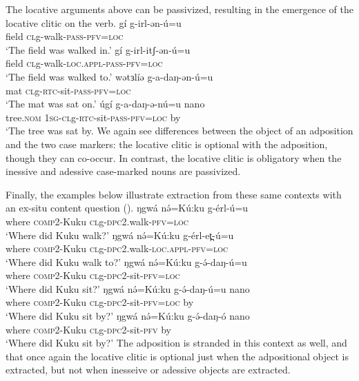 The locative arguments above can be passivized, resulting in the emergence of the locative clitic on the verb. 
\ea 	\gll gí g-irl-ən-ú=u \\
		  field \textsc{cl}g-walk-\textsc{pass}-\textsc{pfv}=\textsc{loc}\\
		\glt `The field was walked in.'
\ex 	\gll gí g-irl-itʃ-ən-ú=u \\
		     field \textsc{cl}g-walk-\textsc{loc.appl}-\textsc{pass}-\textsc{pfv}=\textsc{loc} \\
		\glt `The field was walked to.'
\ex 	\gll 	 wətɜlíə  g-a-daŋ-ən-ú=u \\
			mat		\textsc{cl}g-\textsc{rtc}-sit-\textsc{pass-pfv}=\textsc{loc}\\
		\glt `The mat was sat on.'
\ex	
\gll úgí g-a-daŋ-ə-nú=u nano		\\	
			tree.\textsc{nom} \textsc{1sg}-\textsc{cl}g-\textsc{rtc}-sit-\textsc{pass-pfv=loc} by \\
		\glt `The tree was sat by.
\z 
We again see differences between the object of an adposition and the two case markers: the locative clitic is optional with the adposition, though they can co-occur. In contrast, the locative clitic is obligatory when the inessive and adessive case-marked nouns are passivized.

Finally, the examples below illustrate extraction from these same contexts with an ex-situ content question ().
\ea
		\gll ŋgwá nə́=Kú:ku g-érl-ú=u \\
		     where \textsc{comp2}-Kuku \textsc{cl}g-\textsc{dpc2}.walk-\textsc{pfv}=\textsc{loc} \\
		\glt `Where did Kuku walk?'
\ex 	\gll ŋgwá nə́=Kú:ku g-érl-et̪-ú=u \\
		     where \textsc{comp2}-Kuku \textsc{cl}g-\textsc{dpc2}.walk-\textsc{loc.appl-pfv}=\textsc{loc} \\
		\glt `Where did Kuku walk to?'
\ex 	\gll 	 ŋgwá nə́=Kú:ku g-ə́-daŋ-ú=u \\
			where  \textsc{comp2}-Kuku  \textsc{cl}g-\textsc{dpc2}-sit-\textsc{pfv}=\textsc{loc}\\
		\glt `Where did Kuku sit?'
\ex	
	\ea \gll ŋgwá  nə́=Kú:ku g-ə́-daŋ-ú=u nano		\\	
			where \textsc{comp2}-Kuku  \textsc{cl}g-\textsc{dpc2}-sit-\textsc{pfv=loc} by \\
		\glt `Where did Kuku sit by?'
	\ex \gll ŋgwá  nə́=Kú:ku g-ə́-daŋ-ó nano		\\	
			where \textsc{comp2}-Kuku  \textsc{cl}g-\textsc{dpc2}-sit-\textsc{pfv} by \\
		\glt `Where did Kuku sit by?'
	\z 
\z 
The adposition is stranded in this context as well, and that once again the locative clitic is optional just when the adpositional object is extracted, but not when inesseive or adessive objects are extracted.

